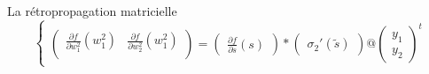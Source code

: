 \begin{frame}{La rétropropagation matricielle}
    \begin{equation}
        \begin{cases}
            \begin{pmatrix}
                \frac{\partial f}{\partial w^2_1}(w^2_1)  & \frac{\partial f}{\partial w^2_2}(w^2_1) \\
               
            \end{pmatrix}
            =
            \begin{pmatrix}
                \frac{\partial f}{\partial s}(s)
            \end{pmatrix}
            *
            \begin{pmatrix}
                \sigma_2 '(\tilde{s}) 
            \end{pmatrix}
            @ 
            \begin{pmatrix}
                y_1 \\
                y_2
            \end{pmatrix} ^t


\end{cases}
\end{equation}
\end{frame}
